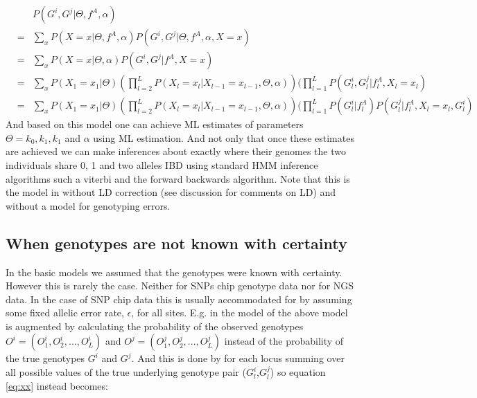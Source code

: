 \documentclass[a4paper, 11pt]{article}
\begin{document}
\scriptsize%
\begin{eqnarray}%
&&P(G^{i},G^{j}| \Theta,f^A,\alpha)\\
&=& \sum_x P(X=x|\Theta,f^A,\alpha)P(G^{i},G^{j}| \Theta,f^A,\alpha,X=x)\\
&=& \sum_x P(X=x|\Theta,\alpha)P(G^{i},G^{j}|f^A,X=x)\\
&=& \sum_x P(X_1=x_1|\Theta) (\prod_{l=2}^L P(X_l=x_l|X_{l-1}=x_{l-1},\Theta,\alpha))(\prod_{l=1}^LP(G^{i}_l,G^{j}_l|f^A_l,X_l=x_l)\\
&=& \sum_x P(X_1=x_1|\Theta) (\prod_{l=2}^L P(X_l=x_l|X_{l-1}=x_{l-1},\Theta,\alpha))(\prod_{l=1}^LP(G^{i}_l|f^A_l)P(G^{j}_l|f^A_l,X_l=x_l,G^{i}_l) \label{eq:xx}
\end{eqnarray}%
\normalsize
And based on this model one can achieve ML estimates of parameters $\Theta=k_0,k_1, k_1$ and $\alpha$ using ML estimation. And not only that once these estimates are achieved we can make inferences about exactly where their genomes the two individuals share 0, 1 and two alleles IBD using standard HMM inference algorithms such a viterbi and the forward backwards algorithm.  
Note that this is the model in \cite{Albrechtsen09} without LD correction (see discussion for comments on LD) and without a model for genotyping errors.

\subsection*{When genotypes are not known with certainty}
In the basic models we assumed that the genotypes were known with certainty. However this is rarely the case. Neither for SNPs chip genotype data nor for NGS data. In the case of SNP chip data this is usually accommodated for by assuming some fixed allelic error rate,  $\epsilon$, for all sites.  E.g. in the model of \cite{Albrechtsen09} the above model is augmented by calculating the probability of the observed genotypes $O^{i}=(O^{i}_1,O^{i}_2,...,O^{i}_L)$ and $O^{j}=(O^{j}_1,O^{j}_2,...,O^{j}_L)$ instead of the probability of the true genotypes $G^i$ and $G^j$. And this is done by for each locus summing over all possible values of the true underlying genotype pair ($G^{i}_l$,$G^{j}_l$) so equation \ref{eq:xx} instead becomes:%
\end{document}
